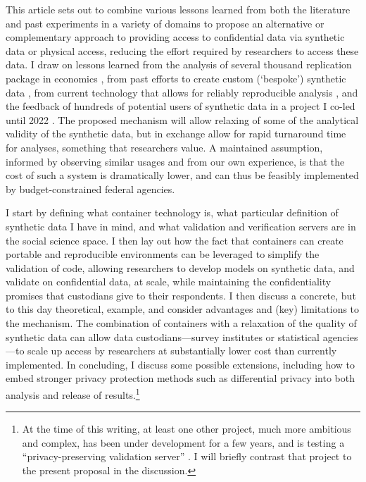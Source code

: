 \documentclass[inline]{hdsr}
\begin{document}
This article sets out to combine various lessons learned from both the literature and past experiments in a variety of domains to propose an alternative or complementary approach to providing access to confidential data via synthetic data or physical access, reducing the effort required by researchers to access these data. I draw on lessons learned from the analysis of several thousand replication package in economics \citep{vilhuber_report_2025}, from past efforts to create custom (`bespoke') synthetic data \citep{nowok_providing_2017}, from current technology that allows for reliably reproducible analysis \citep[\textbf{containers}, see ][for an introduction]{boettiger_introduction_2015}, and the feedback of hundreds of potential users of synthetic data in a project I co-led until 2022 \citep{vilhuber_end_2022}. The proposed mechanism will allow relaxing of some of the analytical validity of the synthetic data, but in exchange allow for rapid turnaround time for analyses, something that researchers value. A maintained assumption, informed by observing similar usages and from our own experience, is that the cost of such a system is dramatically lower, and can thus be feasibly implemented by budget-constrained federal agencies. 


I start by defining what container technology is, what particular definition of synthetic data I have in mind, and what validation and verification servers are in the social science space. I then lay out how the fact that containers can create portable and reproducible environments can be leveraged to simplify the validation of code, allowing researchers to develop models on synthetic data, and validate on confidential data, at scale, while maintaining the confidentiality promises that custodians give to their respondents. I then discuss a concrete, but to this day theoretical, example, and consider advantages and (key) limitations to the mechanism. The combination of containers with a relaxation of the quality of synthetic data can allow data custodians---survey institutes or statistical agencies---to scale up access by researchers at substantially lower cost than currently implemented. In concluding, I discuss some possible extensions, including how to embed stronger privacy protection methods such as differential privacy into both analysis and release of results.\footnote{At the time of this writing, at least one other project, much more ambitious and complex, has been under development for a few years, and is testing a ``privacy-preserving validation server'' \citep{burman2018,tyagi_privacy-preserving_2024}. I will briefly contrast that project to the present proposal in the discussion.}
\end{document}
